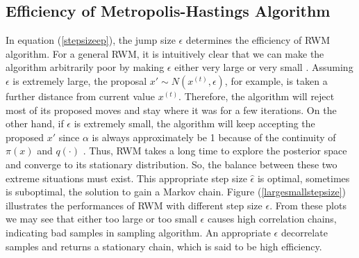 



\subsection{Efficiency of Metropolis-Hastings Algorithm}\label{effMHA}

In equation (\ref{stepsizeep}), the jump size $\epsilon$ determines the efficiency of RWM algorithm. For a general RWM, it is intuitively clear that we can make the algorithm arbitrarily poor by making $\epsilon$ either very large or very small \cite{sherlock2010random}. Assuming $\epsilon$ is extremely large, the proposal $x'\sim N(x^{(t)},\epsilon)$, for example, is taken a further distance from current value $x^{(t)}$. Therefore, the algorithm will reject most of its proposed moves and stay where it was for a few iterations. On the other hand, if $\epsilon$ is extremely small, the algorithm will keep accepting the proposed $x'$ since $\alpha$ is always approximately be 1 because of the continuity of $\pi(x)$ and $q(\cdot)$ \cite{roberts2001optimal}. Thus, RWM takes a long time to explore the posterior space and converge to its stationary distribution. So, the balance between these two extreme situations must exist. This appropriate step size $\hat{\epsilon}$ is optimal, sometimes is suboptimal, the solution to gain a Markov chain. Figure (\ref{largesmallstepsize}) illustrates the performances of RWM with different step size $\epsilon$. From these plots we may see that either too large or too small $\epsilon$ causes high correlation chains, indicating bad samples in sampling algorithm. An appropriate $\epsilon$ decorrelate samples and returns a stationary chain, which is said to be high efficiency. 





